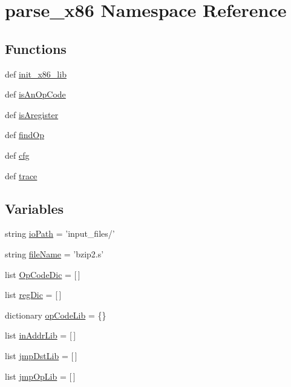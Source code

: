 \hypertarget{namespaceparse__x86}{
\section{parse\_\-x86 Namespace Reference}
\label{namespaceparse__x86}
}
\subsection*{Functions}
\begin{DoxyCompactItemize}
\item 
def \hyperlink{namespaceparse__x86_a758dba9b6ef5bfb993964c7673c1a495}{init\_\-x86\_\-lib}
\item 
def \hyperlink{namespaceparse__x86_a2712bf248a09b7179fbbd2ab2eb11d79}{isAnOpCode}
\item 
def \hyperlink{namespaceparse__x86_af276c0d9a3df1331caeda2b0fdf5b688}{isAregister}
\item 
def \hyperlink{namespaceparse__x86_a4c9598d09cbc721244afd90ddb48350f}{findOp}
\item 
def \hyperlink{namespaceparse__x86_ad838e5ea14a7b662e716b079640434f0}{cfg}
\item 
def \hyperlink{namespaceparse__x86_a25693017cff430882e0561015d7cc616}{trace}
\end{DoxyCompactItemize}
\subsection*{Variables}
\begin{DoxyCompactItemize}
\item 
string \hyperlink{namespaceparse__x86_ab11d9d1a0626bdc175b6c2ee03df263e}{ioPath} = 'input\_\-files/'
\item 
string \hyperlink{namespaceparse__x86_a955e505bf61e73978f2a0351a8481b65}{fileName} = 'bzip2.s'
\item 
list \hyperlink{namespaceparse__x86_a56713be80c3e4856d60fc33a697d065c}{OpCodeDic} = \mbox{[}$\,$\mbox{]}
\item 
list \hyperlink{namespaceparse__x86_a1f421232296d44b3b18cae411013e390}{regDic} = \mbox{[}$\,$\mbox{]}
\item 
dictionary \hyperlink{namespaceparse__x86_a0884442b075e5ca56c09a9ffc1a57f7c}{opCodeLib} = \{\}
\item 
list \hyperlink{namespaceparse__x86_aeca34d9cbbf4caa2875e549339985223}{inAddrLib} = \mbox{[}$\,$\mbox{]}
\item 
list \hyperlink{namespaceparse__x86_a02affd150cd87ae056585236c3217200}{jmpDstLib} = \mbox{[}$\,$\mbox{]}
\item 
list \hyperlink{namespaceparse__x86_a0fb61b722a1498e50bf52375a7fb2fa8}{jmpOpLib} = \mbox{[}$\,$\mbox{]}
\end{DoxyCompactItemize}


